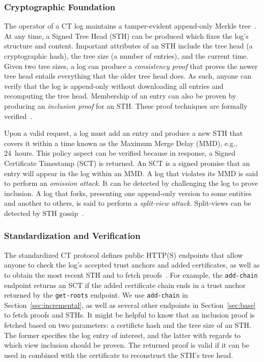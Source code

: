 \subsubsection{Cryptographic Foundation}
The operator of a CT log maintains a tamper-evident append-only Merkle
tree~\cite{ct,ct/bis}.  At any time, a Signed Tree Head (STH) can be produced
which fixes the log's structure and content.  Important attributes of an STH
include
	the tree head (a cryptographic hash),
	the tree size (a number of entries), and
	the current time.
Given two tree sizes, a log can produce a \emph{consistency proof} that proves
the newer tree head entails everything that the older tree head does.  As such,
anyone can verify that the log is append-only without downloading all entries
and recomputing the tree head.  Membership of an entry can also be proven
by producing an \emph{inclusion proof} for an STH.  These proof techniques are
formally verified~\cite{secure-logging-and-ct}.

Upon a valid request, a log must add an entry and produce a new STH that covers
it within a time known as the Maximum Merge Delay (MMD), e.g., 24~hours.  This
policy aspect can be verified because in response, a Signed Certificate
Timestamp (SCT) is returned.  An SCT is a signed promise that an entry will
appear in the log within an MMD.  A log that violates its MMD is said to perform
an \emph{omission attack}.  It can be detected by challenging the log to prove
inclusion.  A log that forks, presenting one append-only version
to some entities and another to others, is said to perform a \emph{split-view
attack}.  Split-views can be detected by STH
gossip~\cite{chuat,dahlberg,nordberg,syta}.

\subsubsection{Standardization and Verification}
The standardized CT protocol defines public HTTP(S) endpoints that allow anyone
to check the log's accepted trust anchors and added certificates, as well as
to obtain the most recent STH and to fetch proofs~\cite{ct,ct/bis}.  For
example, the \texttt{add-chain} endpoint returns an SCT if the added certificate
chain ends in a trust anchor returned by the \texttt{get-roots} endpoint.  We
use \texttt{add-chain} in Section~\ref{sec:incremental}, as well as several
other endpoints in Section~\ref{sec:base} to fetch proofs and STHs.  It might be
helpful to know that an inclusion proof is fetched based on two parameters: a
certificte hash and the tree size of an STH.  The former specifies the log entry
of interest, and the latter with regards to which view inclusion should be
proven.  The returned proof is valid if it can be used in combined with the
certificate to reconstruct the STH's tree head.

